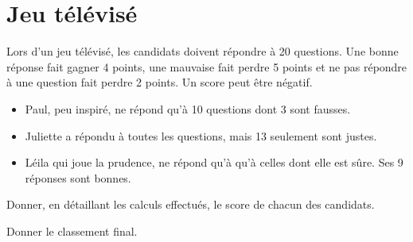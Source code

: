 \section{Jeu télévisé}

Lors d'un jeu télévisé, les candidats doivent répondre à 20 questions. Une bonne réponse fait gagner 4 points, une mauvaise fait perdre 5 points et ne pas répondre à une question fait perdre 2 points. Un score peut être négatif.

\begin{itemize}
	\item Paul, peu inspiré, ne répond qu'à 10 questions dont 3 sont fausses.
	\item Juliette a répondu à toutes les questions, mais 13 seulement sont justes.
	\item Léila qui joue la prudence, ne répond qu'à qu'à celles dont elle est sûre. Ses 9 réponses sont bonnes.
\end{itemize}

\begin{questions}
	\question Donner, en détaillant les calculs effectués, le score de chacun des candidats.
	
	\question Donner le classement final.
\end{questions}